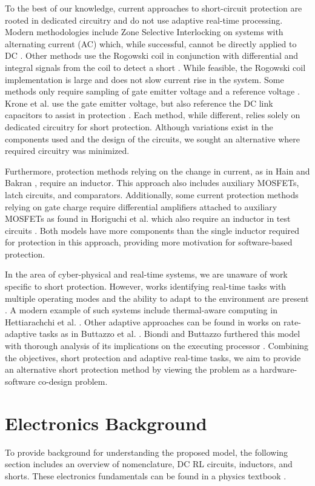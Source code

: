 \documentclass[11pt,compsoc,oneside]{report}
\begin{document}
To the best of our knowledge, current approaches to short-circuit protection are rooted in dedicated circuitry and do not use adaptive real-time processing. Modern methodologies include Zone Selective Interlocking on systems with alternating current (AC) which, while successful, cannot be directly applied to DC \cite{scd}. Other methods use the Rogowski coil in conjunction with differential and integral signals from the coil to detect a short \cite{rogowskiCoil}. While feasible, the Rogowski coil implementation is large and does not slow current rise in the system. Some methods only require sampling of gate emitter voltage and a reference voltage \cite{gateChargeChara}. Krone et al. use the gate emitter voltage, but also reference the DC link capacitors to assist in protection \cite{fastAndEasilyImplementable}. Each method, while different, relies solely on dedicated circuitry for short protection. Although variations exist in the components used and the design of the circuits, we sought an alternative where required circuitry was minimized.

Furthermore, protection methods relying on the change in current, as in Hain and Bakran \cite{ultraFastSCD}, require an inductor. This approach also includes auxiliary MOSFETs, latch circuits, and comparators. Additionally, some current protection methods relying on gate charge require differential amplifiers attached to auxiliary MOSFETs as found in Horiguchi et al. which also require an inductor in test circuits \cite{hiSpeedProtection}. Both models have more components than the single inductor required for protection in this approach, providing more motivation for software-based protection.

In the area of cyber-physical and real-time systems, we are unaware of work specific to short protection. However, works identifying real-time tasks with multiple operating modes and the ability to adapt to the environment are present \cite{modeChangeSystems}. A modern example of such systems include thermal-aware computing in Hettiarachchi et al. \cite{thermalAware}. Other adaptive approaches can be found in works on rate-adaptive tasks as in Buttazzo et al. \cite{rateAdaptive}. Biondi and Buttazzo furthered this model with thorough analysis of its implications on the executing processor \cite{engineCtrl}. Combining the objectives, short protection and adaptive real-time tasks, we aim to provide an alternative short protection method by viewing the problem as a hardware-software co-design problem.

\chapter{Electronics Background}\label{chap:electronics background}
To provide background for understanding the proposed model, the following section includes an overview of nomenclature, DC RL circuits, inductors, and shorts. These electronics fundamentals can be found in a physics textbook \cite{uniphy}.
\end{document}
